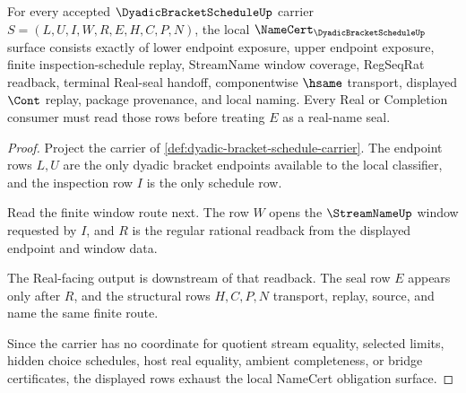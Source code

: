 \begin{theorem}
\label{thm:dyadic-bracket-schedule-namecert-obligations}
For every accepted $\DyadicBracketScheduleUp$ carrier $S=(L,U,I,W,R,E,H,C,P,N)$, the local $\NameCert_{\DyadicBracketScheduleUp}$ surface consists exactly of lower endpoint exposure, upper endpoint exposure, finite inspection-schedule replay, StreamName window coverage, RegSeqRat readback, terminal Real-seal handoff, componentwise $\hsame$ transport, displayed $\Cont$ replay, package provenance, and local naming. Every Real or Completion consumer must read those rows before treating $E$ as a real-name seal.
\end{theorem}
\begin{proof}
Project the carrier of \autoref{def:dyadic-bracket-schedule-carrier}. The endpoint rows $L,U$ are the only dyadic bracket endpoints available to the local classifier, and the inspection row $I$ is the only schedule row.

Read the finite window route next. The row $W$ opens the $\StreamNameUp$ window requested by $I$, and $R$ is the regular rational readback from the displayed endpoint and window data.

The Real-facing output is downstream of that readback. The seal row $E$ appears only after $R$, and the structural rows $H,C,P,N$ transport, replay, source, and name the same finite route.

Since the carrier has no coordinate for quotient stream equality, selected limits, hidden choice schedules, host real equality, ambient completeness, or bridge certificates, the displayed rows exhaust the local NameCert obligation surface.
\end{proof}

